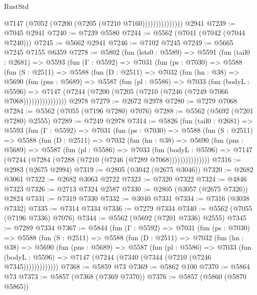 \begin{lexlean}{RustStd}
\begin{coremodule}
                        @7147 (@7052 (@7200 (@7205 (@7210 @7160)))))))))))))))
    @2941
@7239 := @7045 @2941
@7240 := @7239 @5580
@7244 := @5562 (@7041 (@7042 (@7044 @7240)))
@7245 := @5662 @2941
@7246 := @7102 @7245
@7249 := @5665 @7245 @7155 @6359
@7278 := @5802
    (fun (lets0 : @5589) =>
    @5591
      (fun (tail0 : @2681) =>
      @5593
        (fun (Γ : @5592) =>
        @7031
          (fun (ps : @7030) =>
          @5588
            (fun (S : @2511) =>
            @5588
              (fun (D : @2511) =>
              @7032
                (fun (hn : @38) =>
                @5690
                  (fun (pns : @5689) =>
                  @5587
                    (fun (pl : @5586) =>
                    @7033
                      (fun (bodyL : @5596) =>
                      @7147 (@7244 (@7200 (@7205 (@7210 (@7246 (@7249 @7066 @7068))))))))))))))))
    @2978
@7279 := @2672 @2978
@7280 := @7279 @7068
@7284 := @5562 (@7055 (@7196 @7280) @7076)
@7288 := @5562 (@5692 (@7201 @7280) @2555)
@7289 := @7249 @2978
@7314 := @5826
    (fun (tail0 : @2681) =>
    @5593
      (fun (Γ : @5592) =>
      @7031
        (fun (ps : @7030) =>
        @5588
          (fun (S : @2511) =>
          @5588
            (fun (D : @2511) =>
            @7032
              (fun (hn : @38) =>
              @5690
                (fun (pns : @5689) =>
                @5587
                  (fun (pl : @5586) =>
                  @7033
                    (fun (bodyL : @5596) =>
                    @7147 (@7244 (@7284 (@7288 (@7210 (@7246 (@7289 @7068)))))))))))))))
@7316 := @2983 (@2675 @2994)
@7319 := @2805 (@3042 (@2675 @3046))
@7320 := @2682 @3061
@7322 := @2682 @3063 @2722
@7323 := @7320 @7322
@7324 := @4846 @7323
@7326 := @2713 @7324 @2587
@7330 := @2805 (@3057 (@2675 @7326)) @2824
@7331 := @7319 @7330
@7332 := @3040 @7331
@7334 := @7316 (@3038 @7332)
@7335 := @7314 @7334
@7336 := @7279 @7334
@7340 := @5562 (@7055 (@7196 @7336) @7076)
@7344 := @5562 (@5692 (@7201 @7336) @2555)
@7345 := @7289 @7334
@7367 := @5844
    (fun (Γ : @5592) =>
    @7031
      (fun (ps : @7030) =>
      @5588
        (fun (S : @2511) =>
        @5588
          (fun (D : @2511) =>
          @7032
            (fun (hn : @38) =>
            @5690
              (fun (pns : @5689) =>
              @5587
                (fun (pl : @5586) =>
                @7033
                  (fun (bodyL : @5596) =>
                  @7147 (@7244 (@7340 (@7344 (@7210 (@7246 @7345)))))))))))))
@7368 := @5859 @73
@7369 := @5862 @100
@7370 := @5864 @73
@7373 := @5857 (@7368 (@7369 @7370))
@7376 := @5857 (@5860 (@5870 @5865))

\end{coremodule}
\end{lexlean}
